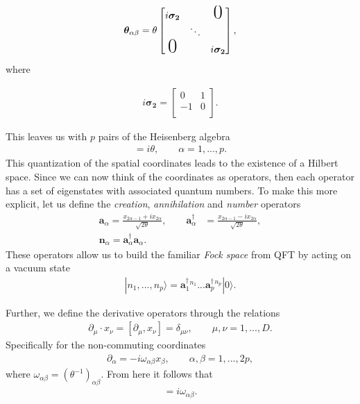     \begin{align}
        \bm{\theta}_{\alpha \beta } = \theta \begin{bmatrix}
            i \bm{\sigma_2} &  & \text{\huge0} \\
                     & \ddots &  \\
                    \text{\huge0} &  & i \bm{\sigma_2} \\
                \end{bmatrix},
    \end{align}
    where 

    \begin{align}
        i \bm{\sigma_2} = \begin{bmatrix}
            0 & 1 \\
            -1 & 0 \\
        \end{bmatrix}.
    \end{align}

    This leaves us with $p$ pairs of the Heisenberg algebra
    \begin{align}
        [x_{2\alpha -1}, x_{2\alpha}]=i\theta, \qquad \alpha=1,...,p.
    \end{align}
    This quantization of the spatial coordinates leads to the existence of a Hilbert space. Since we can now think of the coordinates as operators, then each operator has a set of eigenstates with associated quantum numbers. To make this more explicit, let us define the \textit{creation}, \textit{annihilation} and \textit{number} operators
    \begin{align}
        \bm{a}_{\alpha} = \frac{x_{2\alpha-1} +i x_{2\alpha}}{\sqrt{2 \theta}}, \qquad \bm{a}^{\dag}_{\alpha} &= \frac{x_{2\alpha-1} -i x_{2\alpha}}{\sqrt{2 \theta}}, \\
        \bm{n}_{\alpha} = \bm{a}^{\dag}_{\alpha}\bm{a}_{\alpha}.
    \end{align}
    These operators allow us to build the familiar \textit{Fock space} from QFT by acting on a vacuum state
    \begin{align}
        |n_1,...,n_p\rangle=  \bm{a}^{\dag}_1^{n_1}... \bm{a}^{\dag}_p^{n_p}|0\rangle.
    \end{align}

    Further, we define the derivative operators through the relations
    \begin{align}
        \partial_{\mu} \cdot x_{\nu} = [\partial_{\mu}, x_{\nu}] = \delta_{\mu \nu}, \qquad \mu,\nu = 1,...,D.
    \end{align}
    Specifically for the non-commuting coordinates
    \begin{align}
        \partial_{\alpha}= -i \omega_{\alpha \beta} x_{\beta}, \qquad \alpha, \beta = 1,...,2p,
    \end{align}
    where $\omega_{\alpha \beta} = \left(\theta^{-1} \right)_{\alpha \beta}$. From here it follows that
    \begin{align}
        [\partial_{\alpha}, \partial_{\beta}] = i \omega_{\alpha \beta}.
    \end{align}


